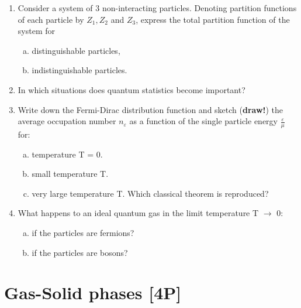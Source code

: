 \documentclass[12pt,a4paper]{article} %
\begin{document}
\begin{enumerate}[1.]
    \item Consider a system of 3 non-interacting particles. Denoting partition functions of each particle by $Z_1, Z_2$  and $Z_3$, express the total partition function of the system for
    \begin{enumerate}[a)]
        \item distinguishable particles,
        \item indistinguishable particles.
    \end{enumerate}
    \item In which situations does quantum statistics become important?
    \item Write down the Fermi-Dirac distribution function and sketch (\textbf{draw!}) the average occupation number $n_\varepsilon$ as a function of the single particle energy $\frac{\varepsilon}{\mu}$ for:
     \begin{enumerate}[a)]
        \item temperature T = 0.
        \item small temperature T.
        \item very large temperature T. Which classical theorem is reproduced?
    \end{enumerate}
    \item What happens to an ideal quantum gas in the limit temperature T $\rightarrow$ 0:
     \begin{enumerate}[a)]
        \item if the particles are fermions?
        \item if the particles are bosons?
    \end{enumerate}
\end{enumerate}


\section{Gas-Solid phases [4P]}
\end{document}
